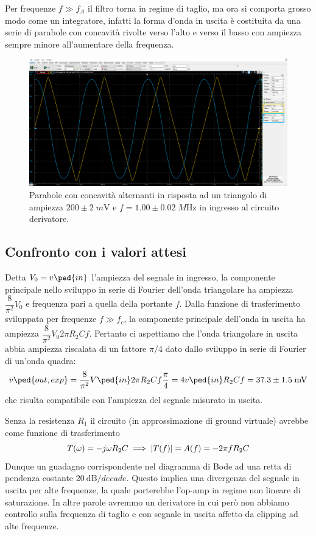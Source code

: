 \documentclass[10pt,a4paper]{article}
\begin{document}
Per frequenze $f \gg f_A$ il filtro torna in regime di taglio, ma ora si
comporta grosso modo come un integratore, infatti la forma d'onda in uscita è
costituita da una serie di parabole con concavità rivolte verso l'alto e verso
il basso con ampiezza sempre minore all'aumentare della frequenza.
\begin{figure}[htbp]
\centering
\includegraphics[scale=0.335]{derpar}
\caption{Parabole con concavità alternanti in risposta ad un triangolo di
ampiezza $200 \pm 2 \; \si{m\V}$ e $f = 1.00 \pm 0.02 \; \si{M\Hz}$ in ingresso
al circuito derivatore. \label{fig: derpar}}
\end{figure}

\subsection{Confronto con i valori attesi}
Detta $V_{0} = v\ped{in} $ l'ampiezza del segnale in ingresso, la componente
principale nello sviluppo in serie di Fourier dell'onda triangolare ha ampiezza 
$\dfrac{8}{\pi^2} V_{0} $ e frequenza pari a quella della portante $f$.
Dalla funzione di trasferimento sviluppata per frequenze $f \gg f_c$,
la componente principale dell'onda in uscita ha ampiezza
$\dfrac{8}{\pi^2} V_{0} 2\pi R_2 C f $. Pertanto ci aspettiamo che l'onda
triangolare in uscita abbia ampiezza riscalata di un fattore $\pi/4$ dato dallo
sviluppo in serie di Fourier di un'onda quadra:
\[
v\ped{out, exp} = \frac{8}{\pi^{2}} V\ped{in} 2 \pi R_{2} C f \frac{\pi}{4} =
4 v\ped{in} R_{2} C f = 37.3 \pm 1.5 \; \si{m\V}
\]
che risulta compatibile con l'ampiezza del segnale misurato in uscita.

Senza la resistenza $R_1$ il circuito (in approssimazione di ground virtuale)
avrebbe come funzione di trasferimento
\begin{equation}\label{eq: hpfTfunc}
T(\omega) = - j \omega R_2 C \implies
\left| T(f) \right| = A(f) =  - 2\pi f R_2 C
\end{equation}
Dunque un guadagno corrispondente nel diagramma di Bode ad una retta di
pendenza costante $\SI{20}{\deci\bel/decade}$.
Questo implica una divergenza del segnale in uscita per alte frequenze, la
quale porterebbe l'op-amp in regime non lineare di saturazione.
In altre parole avremmo un derivatore in cui però non abbiamo controllo sulla
frequenza di taglio e con segnale in uscita affetto da clipping ad alte
frequenze.
\end{document}
